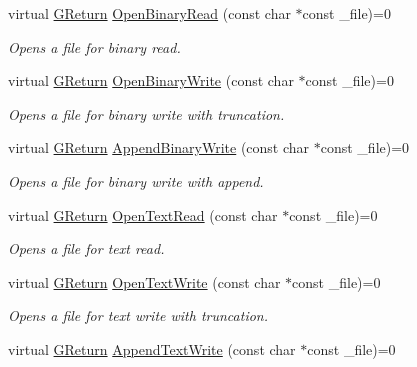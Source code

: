 \begin{DoxyCompactItemize}
\item 
virtual \mbox{\hyperlink{namespaceGW_a67a839e3df7ea8a5c5686613a7a3de21}{G\+Return}} \mbox{\hyperlink{classGW_1_1SYSTEM_1_1GFile_a2744359d5d258b1b59d139101c6809ce}{Open\+Binary\+Read}} (const char $\ast$const \+\_\+file)=0
\begin{DoxyCompactList}\small\item\em Opens a file for binary read. \end{DoxyCompactList}\item 
virtual \mbox{\hyperlink{namespaceGW_a67a839e3df7ea8a5c5686613a7a3de21}{G\+Return}} \mbox{\hyperlink{classGW_1_1SYSTEM_1_1GFile_a8d5f335bbc6f7c6d798ed27718aa2347}{Open\+Binary\+Write}} (const char $\ast$const \+\_\+file)=0
\begin{DoxyCompactList}\small\item\em Opens a file for binary write with truncation. \end{DoxyCompactList}\item 
virtual \mbox{\hyperlink{namespaceGW_a67a839e3df7ea8a5c5686613a7a3de21}{G\+Return}} \mbox{\hyperlink{classGW_1_1SYSTEM_1_1GFile_a63311236692181f99fd393fe8e1ca9fc}{Append\+Binary\+Write}} (const char $\ast$const \+\_\+file)=0
\begin{DoxyCompactList}\small\item\em Opens a file for binary write with append. \end{DoxyCompactList}\item 
virtual \mbox{\hyperlink{namespaceGW_a67a839e3df7ea8a5c5686613a7a3de21}{G\+Return}} \mbox{\hyperlink{classGW_1_1SYSTEM_1_1GFile_ac3ece72ce30e4d1a1c426c53a7a8354a}{Open\+Text\+Read}} (const char $\ast$const \+\_\+file)=0
\begin{DoxyCompactList}\small\item\em Opens a file for text read. \end{DoxyCompactList}\item 
virtual \mbox{\hyperlink{namespaceGW_a67a839e3df7ea8a5c5686613a7a3de21}{G\+Return}} \mbox{\hyperlink{classGW_1_1SYSTEM_1_1GFile_aebd3e32736b994c0296b7575ab0a2759}{Open\+Text\+Write}} (const char $\ast$const \+\_\+file)=0
\begin{DoxyCompactList}\small\item\em Opens a file for text write with truncation. \end{DoxyCompactList}\item 
virtual \mbox{\hyperlink{namespaceGW_a67a839e3df7ea8a5c5686613a7a3de21}{G\+Return}} \mbox{\hyperlink{classGW_1_1SYSTEM_1_1GFile_a72e40b3234a2384738d8db6e958f4782}{Append\+Text\+Write}} (const char $\ast$const \+\_\+file)=0

\end{DoxyCompactItemize}
